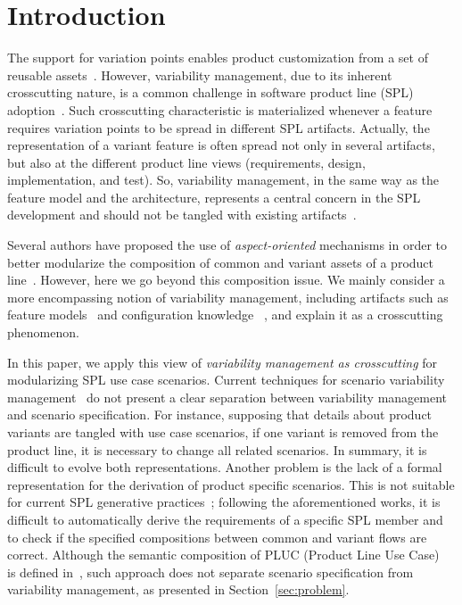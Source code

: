 \documentclass{acm_proc_article-sp}
\begin{document}


\section{Introduction}
The support for variation points enables product customization from a set of
reusable assets~\cite{Pohl:2005aa}. However, variability management, due to its
inherent crosscutting nature, is a common challenge in software product line
(SPL) adoption~\cite{Clements:2001aa,Pohl:2005aa}. Such crosscutting
characteristic is materialized whenever a feature requires variation points to be
spread in different SPL artifacts. Actually, the representation of a variant
feature is often spread not only in several artifacts, but also at the different
product line views (requirements, design, implementation, and test). So,
variability management, in the same way as the feature model and the
architecture, represents a central concern in the SPL development and should not
be tangled with existing artifacts~\cite{Pohl:2005aa}.
 
Several authors have proposed the use of \emph{aspect-oriented} mechanisms in
order to better modularize the composition of common and variant assets of a
product line~\cite{sousa:aosd-ea04, moreira-re07, eriksson-splc-2005,
pohl-caise-2005, alves-gpce-06, apel-icse2006}. However, here we go beyond this
composition issue. We mainly consider a more encompassing notion of variability
management, including artifacts such as feature
models~\cite{gheyi-alloy-06,Czarnecki:2000aa} and configuration knowledge~
\cite{Czarnecki:2000aa,Pohl:2005aa}, and explain it  as a crosscutting
phenomenon.

In this paper, we apply this view of \emph{variability management as
crosscutting} for modularizing SPL use case scenarios. Current techniques for
scenario variability
management~\cite{favaro-icsr-98,Bertolino:2003aa,Eriksson:2005aa} do not
present a clear separation between variability management and scenario
specification. For instance, supposing that details about product variants are
tangled with  use case scenarios, if one variant is removed from the product
line, it is necessary to change all related scenarios. In summary, it is
difficult to evolve both representations. Another problem is the lack of a formal
representation for the derivation of product specific scenarios. This is not
suitable for current SPL generative practices~\cite{krueger-cacm-200712};
following the aforementioned works, it is difficult to automatically derive the
requirements of a specific SPL member and to check if the specified compositions
between common and variant flows are correct.  Although  the semantic composition
of PLUC (Product Line Use Case)~\cite{Bertolino:2003aa} is defined
in~\cite{fantechi-splc-2004}, such approach does not separate scenario
specification from variability management, as presented in
Section~\ref{sec:problem}.
\end{document}

